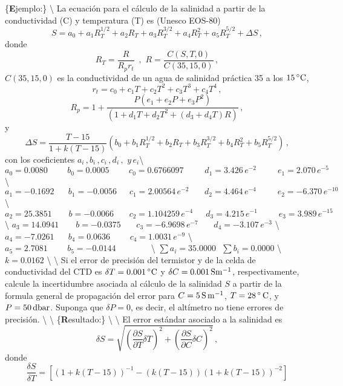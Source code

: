 \documentclass[
]{agujournal2019}
\begin{document}
\{\noindent \textbf Ejemplo:\} \textbackslash{} \noindent La ecuación
para el cálculo de la salinidad a partir de la conductividad (C) y
temperatura (T) es (Unesco EOS-80)
\[S=a_0+a_1 R_T^{1/2}+a_2 R_T+a_3 R_T^{3/2}+a_4 R_T^{2}+a_5 R_T^{5/2}+\Delta{S}\,,\]
donde
\[R_T=\frac{R}{R_p r_t}\,\,\,,\,\,R=\frac{C(S,T,0)}{C(35,15,0)}\,,\]
\(C(35,15,0)\) es la conductividad de un agua de salinidad práctica 35 a
los \(15\,^\circ{\rm C}\),
\[r_t=c_0 + c_1 T + c_2 T^2 + c_3T^3 + c_4T^4\,,\]
\[R_p=1+\frac{P(e_1+e_2P+e_3P^2)}{(1+d_1T+d_2T^2+(d_3 + d_4T)R)}\,,\] y
\[\Delta{S}=\frac{T-15}{1+k(T-15)}(b_0+b_1 R_T^{1/2}+b_2 R_T+b_3 R_T^{3/2}+b_4 R_T^{2}+b_5 R_T^{5/2})\,,\]
con los coeficientes
\(a_i\,,b_i\,,c_i\,,d_i\,,\,\,y\,e_i\)\textbackslash{}
\(a_0=0.0080\,\,\,\,\,\,\,\,\,\,\,\,\,\,b_0=0.0005\,\,\,\,\,\,\,\,\,\,\,\,\,\,c_0=0.6766097\,\,\,\,\,\,\,\,\,\,\,\,\,\,\,d_1=3.426\,e^{-2}\,\,\,\,\,\,\,\,\,\,\,\,\,\,\,e_1=2.070\,e^{-5}\)
\textbackslash{}
\(a_1=-0.1692\,\,\,\,\,\,\,\,\,\,b_1=-0.0056\,\,\,\,\,\,\,\,\,c_1=2.00564\,e^{-2}\,\,\,\,\,\,\,\,\,\,\,d_2=4.464\,e^{-4}\,\,\,\,\,\,\,\,\,\,\,\,\,\,\,e_2=-6.370\,e^{-10}\)
\textbackslash{}
\(a_2=25.3851\,\,\,\,\,\,\,\,\,\,\,\,b=-0.0066\,\,\,\,\,\,\,\,\,\,\,c_2=1.104259\,e^{-4}\,\,\,\,\,\,\,\,\,d_3=4.215\,e^{-1}\,\,\,\,\,\,\,\,\,\,\,\,\,\,\,e_3=3.989\,e^{-15}\)
\textbackslash{}
\(a_3=14.0941\,\,\,\,\,\,\,\,\,\,\,\,b=-0.0375\,\,\,\,\,\,\,\,\,\,\,c_3=-6.9698\,e^{-7}\,\,\,\,\,\,\,\,\,\,\,d_4=-3.107\,e^{-3}\)
\textbackslash{}
\(a_4=-7.0261\,\,\,\,\,\,\,\,\,\,b_4=0.0636\,\,\,\,\,\,\,\,\,\,\,\,\,\,c_4=1.0031\,e^{-9}\)
\textbackslash{}
\(a_5=2.7081\,\,\,\,\,\,\,\,\,\,\,\,\,\,b_5=-0.0144\,\,\,\,\,\,\,\,\,\,\,\,\,\,\,\,\,\,\,\,\,\,\,\,\,\)\textbackslash{}
\(\sum a_i=35.0000\,\,\,\,\sum b_i=0.0000\) \textbackslash{}
\(k=0.0162\) \textbackslash{} \textbackslash{} \noindent Si el error de
precisión del termistor y de la celda de conductividad del CTD es
\(\delta{T}=0.001\,^\circ{\rm C}\) y
\(\delta{C}=0.001\,{\rm S}{\rm m}^{-1}\), respectivamente, calcule la
incertidumbre asociada al cálculo de la salinidad \(S\) a partir de la
formula general de propagación del error para
\(C=5\,{\rm S}\,{\rm m}^{-1}\), \(T=28\,^\circ\,{\rm C}\), y
\(P=50\,{\rm dbar}\). Suponga que \(\delta{P}=0\), es decir, el
altímetro no tiene errores de precisión. \textbackslash{}
\textbackslash{} \{\textbf Resultado:\} \textbackslash{}
\textbackslash{} \noindent El error estándar asociado a la salinidad es
\[\delta{S}=\sqrt{\left( \frac{\partial{S}}{\partial{T}}\delta{T} \right)^2 +
                  \left( \frac{\partial{S}}{\partial{C}}\delta{C}\right)^2}\,,
          \] donde \[\frac{\delta{S}}{\delta{T}}=
      \left[(1+k(T-15))^{-1} - (k(T-15))(1+k(T-15))^{-2}\right]\]
\end{document}
